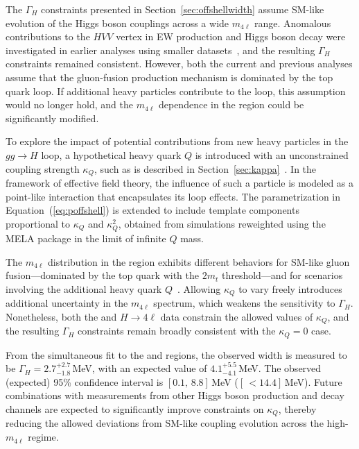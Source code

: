 The $\Gamma_H$ constraints presented in Section~\ref{sec:offshellwidth} assume SM-like evolution of the Higgs boson couplings across a wide $m_{4\ell}$ range. Anomalous contributions to the $HVV$ vertex in EW production and Higgs boson decay were investigated in earlier analyses using smaller datasets~\cite{Sirunyan:2019twz,CMS:2022ley}, and the resulting $\Gamma_H$ constraints remained consistent. However, both the current and previous analyses assume that the gluon-fusion production mechanism is dominated by the top quark loop. If additional heavy particles contribute to the loop, this assumption would no longer hold, and the $m_{4\ell}$ dependence in the \offshell region could be significantly modified.

To explore the impact of potential contributions from new heavy particles in the $gg \to H$ loop, a hypothetical heavy quark $Q$ is introduced with an unconstrained coupling strength $\kappa_Q$, such as is described in Section~\ref{sec:kappa}~\cite{Gritsan:2020pib,Davis:2021tiv}. In the framework of effective field theory, the influence of such a particle is modeled as a point-like interaction that encapsulates its loop effects. The parametrization in Equation~(\ref{eq:poffshell}) is extended to include template components proportional to $\kappa_Q$ and $\kappa_Q^2$, obtained from simulations reweighted using the MELA package in the limit of infinite $Q$ mass. 

The $m_{4\ell}$ distribution in the \offshell region exhibits different behaviors for SM-like gluon fusion—dominated by the top quark with the $2m_t$ threshold—and for scenarios involving the additional heavy quark $Q$~\cite{Gritsan:2020pib}. Allowing $\kappa_Q$ to vary freely introduces additional uncertainty in the $m_{4\ell}$ spectrum, which weakens the sensitivity to $\Gamma_H$. Nonetheless, both the \onshell and \offshell $H \to 4\ell$ data constrain the allowed values of $\kappa_Q$, and the resulting $\Gamma_H$ constraints remain broadly consistent with the $\kappa_Q = 0$ case.

From the simultaneous fit to the \onshell and \offshell regions, the observed width is measured to be $\Gamma_H = 2.7^{+2.7}_{-1.8}$\,MeV, with an expected value of $4.1^{+5.5}_{-4.1}$\,MeV. The observed (expected) 95\% confidence interval is $[0.1,\,8.8]$\,MeV ($[\,{<}14.4]$\,MeV). Future combinations with measurements from other \onshell Higgs boson production and decay channels are expected to significantly improve constraints on $\kappa_Q$, thereby reducing the allowed deviations from SM-like coupling evolution across the high-$m_{4\ell}$ regime.

